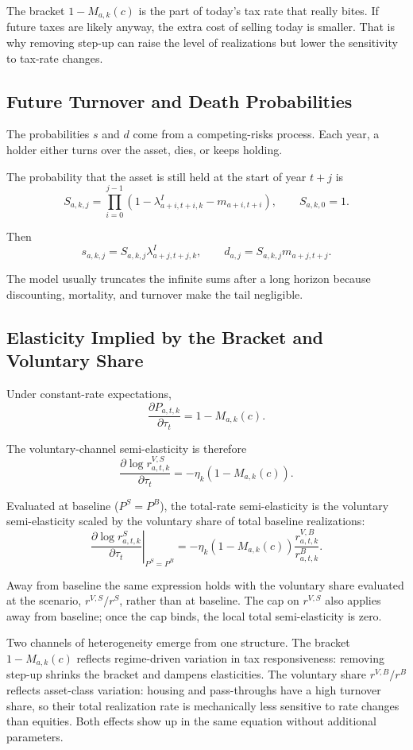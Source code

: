\documentclass[11pt]{article}
\begin{document}
The bracket $1-M_{a,k}(c)$ is the part of today's tax rate that really bites.
If future taxes are likely anyway, the extra cost of selling today is smaller.
That is why removing step-up can raise the level of realizations but lower
the sensitivity to tax-rate changes.

\subsection{Future Turnover and Death Probabilities}

The probabilities $s$ and $d$ come from a competing-risks process. Each year,
a holder either turns over the asset, dies, or keeps holding.

The probability that the asset is still held at the start of year $t+j$ is
\[
S_{a,k,j}
=
\prod_{i=0}^{j-1}
\left(1-\lambda^I_{a+i,t+i,k}-m_{a+i,t+i}\right),
\qquad
S_{a,k,0}=1.
\]

Then
\[
s_{a,k,j}=S_{a,k,j}\lambda^I_{a+j,t+j,k},
\qquad
d_{a,j}=S_{a,k,j}m_{a+j,t+j}.
\]

The model usually truncates the infinite sums after a long horizon because
discounting, mortality, and turnover make the tail negligible.

\subsection{Elasticity Implied by the Bracket and Voluntary Share}

Under constant-rate expectations,
\[
\frac{\partial P_{a,t,k}}{\partial \tau_t}
=
1-M_{a,k}(c).
\]

The voluntary-channel semi-elasticity is therefore
\[
\frac{\partial \log r^{V,S}_{a,t,k}}{\partial \tau_t}
=
-\eta_k\left(1-M_{a,k}(c)\right).
\]

Evaluated at baseline ($P^S=P^B$), the total-rate semi-elasticity is the
voluntary semi-elasticity scaled by the voluntary share of total
baseline realizations:
\[
\boxed{
\left.
\frac{\partial \log r^S_{a,t,k}}{\partial \tau_t}
\right|_{P^S=P^B}
=
-\eta_k\left(1-M_{a,k}(c)\right)
\frac{r^{V,B}_{a,t,k}}{r^B_{a,t,k}}.
}
\]

Away from baseline the same expression holds with the voluntary share
evaluated at the scenario, $r^{V,S}/r^S$, rather than at baseline. The
cap on $r^{V,S}$ also applies away from baseline; once the cap binds,
the local total semi-elasticity is zero.

Two channels of heterogeneity emerge from one structure. The bracket
$1-M_{a,k}(c)$ reflects regime-driven variation in tax responsiveness:
removing step-up shrinks the bracket and dampens elasticities. The voluntary
share $r^{V,B}/r^B$ reflects asset-class variation: housing and pass-throughs
have a high turnover share, so their total realization rate is mechanically
less sensitive to rate changes than equities. Both effects show up in the
same equation without additional parameters.
\end{document}
